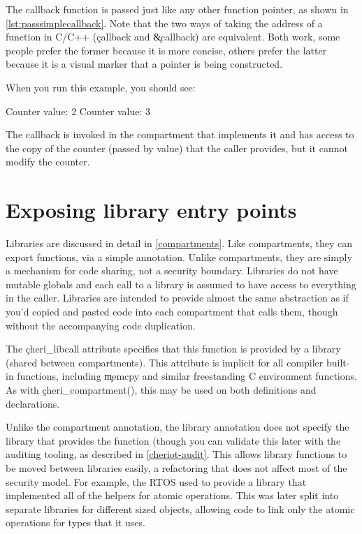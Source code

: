 {{\codelisting[filename=examples/compartment_annotation/entry.cc,marker=callback,label=lst:declaresimplecallback,caption="A function that can be invoked as a cross-compartment callback."]{}

The callback function is passed just like any other function pointer, as shown in \ref{lst:passsimplecallback}.
Note that the two ways of taking the address of a function in C/C++ (\c{callback} and \c{&callback}) are equivalent.
Both work, some people prefer the former because it is more concise, others prefer the latter because it is a visual marker that a pointer is being constructed.

\codelisting[filename=examples/compartment_annotation/entry.cc,marker=compartment_call,label=lst:passsimplecallback,caption="A function that can be invoked as a cross-compartment callback."]{}

When you run this example, you should see:

\begin{console}
Counter value: 2
Counter value: 3
\end{console}

The callback is invoked in the compartment that implements it and has access to the copy of the counter (passed by value) that the caller provides, but it cannot modify the counter.

\section{Exposing library entry points}

Libraries are discussed in detail in \ref{compartments}.
Like compartments, they can export functions, via a simple annotation.
Unlike compartments, they are simply a mechanism for code sharing, not a security boundary.
Libraries do not have mutable globals and each call to a library is assumed to have access to everything in the caller.
Libraries are intended to provide almost the same abstraction as if you'd copied and pasted code into each compartment that calls them, though without the accompanying code duplication.

The \c{cheri_libcall} attribute specifies that this function is provided by a library (shared between compartments).
This attribute is implicit for all compiler built-in functions, including \c{memcpy} and similar freestanding C environment functions.
As with \c{cheri_compartment()}, this may be used on both definitions and declarations.

Unlike the compartment annotation, the library annotation does not specify the library that provides the function (though you can validate this later with the auditing tooling, as described in \ref{cheriot-audit}.
This allows library functions to be moved between libraries easily, a refactoring that does not affect most of the security model.
For example, the RTOS used to provide a library that implemented all of the helpers for atomic operations.
This was later split into separate libraries for different sized objects, allowing code to link only the atomic operations for types that it uses.

}}
